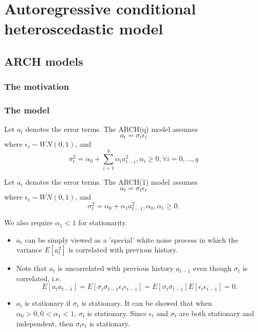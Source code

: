 \begin{definition} 

\end{definition}



\section{Autoregressive conditional heteroscedastic model}
\subsection{ARCH models}
\subsubsection{The motivation}

\subsubsection{The model}
\begin{definition}
	Let $a_t$ denotes the error terms. The ARCH(q) model assumes
	$$a_t = \sigma_t \epsilon_t$$
	where $\epsilon_t\sim WN(0,1)$, 
	and $$\sigma_t^2 = \alpha_0 + \sum_{i=1}^q \alpha_i a_{t-i}^2, \alpha_i\geq 0,\forall i=0,...,q$$
\end{definition}

\begin{definition}
Let $a_t$ denotes the error terms. The ARCH(1) model assumes
$$a_t = \sigma_t \epsilon_t$$
where $\epsilon_t\sim WN(0,1)$, 
and $$\sigma_t^2 = \alpha_0 + \alpha_1 a_{t-1}^2, \alpha_0,\alpha_1 \geq 0.$$

We also require $\alpha_1<1$ for stationarity.
\end{definition}

\begin{remark}[characteristics]\hfill
\begin{itemize}
	\item $a_t$ can be simply viewed as a 'special' white noise process in which the variance $E[a_t^2]$ is correlated with previous history.
	\item Note that $a_t$ is uncorrelated with previous history $a_{t-1}$ even though $\sigma_t$ is correlated, i.e. 
	$$E[a_ta_{t-1}] = E[\sigma_t\sigma_{t-1}\epsilon_t\epsilon_{t-1}] = E[\sigma_t\sigma_{t-1}]E[\epsilon_t\epsilon_{t-1}] = 0.$$
	\item $a_t$ is stationary if $\sigma_t$ is stationary. It can be showed that when $\alpha_0 > 0, 0 < \alpha_1 < 1$, $\sigma_t$ is stationary. Since $\epsilon_t$ and $\sigma_t$ are both stationary and independent, then $\sigma_t\epsilon_t$ is stationary.
\end{itemize}
\end{remark}

